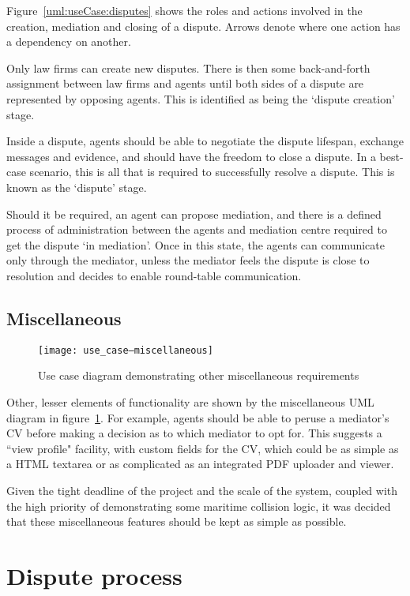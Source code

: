 Figure~\ref{uml:useCase:disputes} shows the roles and actions involved in the creation, mediation and closing of a dispute. Arrows denote where one action has a dependency on another.

Only law firms can create new disputes. There is then some back-and-forth assignment between law firms and agents until both sides of a dispute are represented by opposing agents. This is identified as being the `dispute creation' stage.

Inside a dispute, agents should be able to negotiate the dispute lifespan, exchange messages and evidence, and should have the freedom to close a dispute. In a best-case scenario, this is all that is required to successfully resolve a dispute. This is known as the `dispute' stage.

Should it be required, an agent can propose mediation, and there is a defined process of administration between the agents and mediation centre required to get the dispute `in mediation'. Once in this state, the agents can communicate only through the mediator, unless the mediator feels the dispute is close to resolution and decides to enable round-table communication.

\subsection{Miscellaneous}

\begin{figure}[h!]
  \centering
    \ifimages
    \texttt{[image: use\_case--miscellaneous]}
    \fi
  \caption{Use case diagram demonstrating other miscellaneous requirements}
  \label{uml:useCase:miscellaneous}
\end{figure}

Other, lesser elements of functionality are shown by the miscellaneous UML diagram in figure~\ref{uml:useCase:miscellaneous}. For example, agents should be able to peruse a mediator's CV before making a decision as to which mediator to opt for. This suggests a ``view profile" facility, with custom fields for the CV, which could be as simple as a HTML textarea or as complicated as an integrated PDF uploader and viewer.

Given the tight deadline of the project and the scale of the system, coupled with the high priority of demonstrating some maritime collision logic, it was decided that these miscellaneous features should be kept as simple as possible.

\section{Dispute process}

